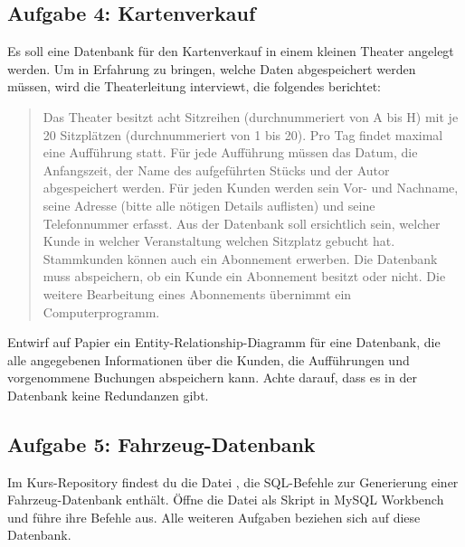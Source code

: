 \subsection{Aufgabe 4: Kartenverkauf}

Es soll eine Datenbank für den Kartenverkauf in einem kleinen Theater angelegt
werden. Um in Erfahrung zu bringen, welche Daten abgespeichert werden müssen,
wird die Theaterleitung interviewt, die folgendes berichtet:

\begin{quotation}
\noindent
Das Theater besitzt acht Sitzreihen (durchnummeriert von A bis H) mit je 20
Sitzplätzen (durchnummeriert von 1 bis 20). Pro Tag findet maximal eine
Aufführung statt. Für jede Aufführung müssen das Datum, die Anfangszeit, der
Name des aufgeführten Stücks und der Autor abgespeichert werden. Für jeden
Kunden werden sein Vor- und Nachname, seine Adresse (bitte alle nötigen Details
auflisten) und seine Telefonnummer erfasst. Aus der Datenbank soll ersichtlich
sein, welcher Kunde in welcher Veranstaltung welchen Sitzplatz gebucht hat.
Stammkunden können auch ein Abonnement erwerben. Die Datenbank muss
abspeichern, ob ein Kunde ein Abonnement besitzt oder nicht. Die weitere
Bearbeitung eines Abonnements übernimmt ein Computerprogramm.
\end{quotation}

Entwirf auf Papier ein Entity-Relationship-Diagramm für eine Datenbank, die
alle angegebenen Informationen über die Kunden, die Aufführungen und
vorgenommene Buchungen abspeichern kann. Achte darauf, dass es in der Datenbank
keine Redundanzen gibt.


\subsection{Aufgabe 5: Fahrzeug-Datenbank}

Im Kurs-Repository findest du die Datei , die SQL-Befehle
zur Generierung einer Fahrzeug-Datenbank enthält. Öffne die Datei als Skript in
MySQL Workbench und führe ihre Befehle aus. Alle weiteren Aufgaben beziehen
sich auf diese Datenbank.

